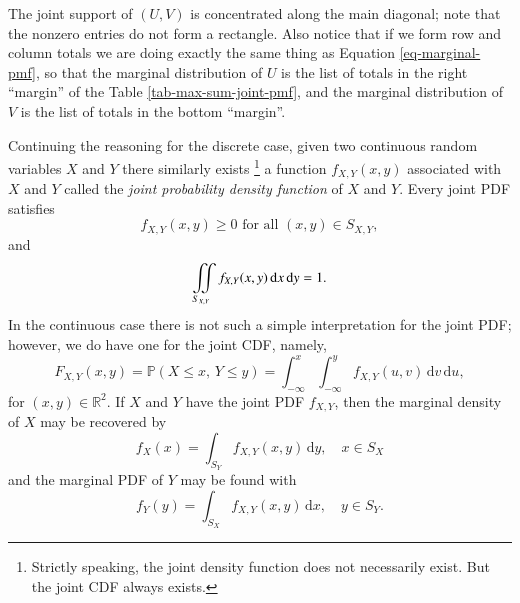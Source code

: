 \documentclass[captions=tableheading]{scrbook}
\begin{document}
\begin{example}
The joint support of \((U,V)\) is concentrated along the main diagonal;  note that the nonzero entries do not form a rectangle. Also notice that if we form row and column totals we are doing exactly the same thing as Equation \ref{eq-marginal-pmf}, so that the marginal distribution of \(U\) is the list of totals in the right ``margin'' of the Table \ref{tab-max-sum-joint-pmf}, and the marginal distribution of \(V\)  is the list of totals in the bottom ``margin''. 
\end{example}

Continuing the reasoning for the discrete case, given two continuous random variables \(X\) and \(Y\) there similarly exists
\footnote{Strictly speaking, the joint density function does not necessarily exist. But the joint CDF always exists.}
a function \(f_{X,Y}(x,y)\) associated with \(X\) and \(Y\) called the \emph{joint probability density function} of \(X\) and \(Y\). Every joint PDF satisfies
\begin{equation}
f_{X,Y}(x,y)\geq0\mbox{ for all }(x,y)\in S_{X,Y},
\end{equation}
and
\begin{equation}
\iintop_{S_{X,Y}}f_{X,Y}(x,y)\,\mathrm{d} x\,\mathrm{d} y=1.
\end{equation}
In the continuous case there is not such a simple interpretation for the joint PDF; however, we do have one for the joint CDF, namely,
\[
F_{X,Y}(x,y)=\mathbb{P}(X\leq x,\, Y\leq y)=\int_{-\infty}^{x}\int_{-\infty}^{y}f_{X,Y}(u,v)\,\mathrm{d} v\,\mathrm{d} u,
\]
for \((x,y)\in\mathbb{R}^{2}\). If \(X\) and \(Y\) have the joint PDF \(f_{X,Y}\), then the marginal density of \(X\) may be recovered by
\begin{equation}
f_{X}(x)=\int_{S_{Y}}f_{X,Y}(x,y)\,\mathrm{d} y,\quad x \in S_{X}
\end{equation}
and the marginal PDF of \(Y\) may be found with
\begin{equation}
f_{Y}(y)=\int_{S_{X}}f_{X,Y}(x,y)\,\mathrm{d} x, \quad y \in S_{Y}.
\end{equation}
\end{document}
